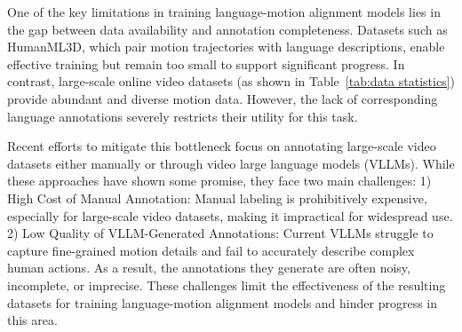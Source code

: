 One of the key limitations in training language-motion alignment models lies in the gap between data availability and annotation completeness. Datasets such as HumanML3D, which pair motion trajectories with language descriptions, enable effective training but remain too small to support significant progress. In contrast, large-scale online video datasets (as shown in Table~\ref{tab:data statistics}) provide abundant and diverse motion data. However, the lack of corresponding language annotations severely restricts their utility for this task.

Recent efforts to mitigate this bottleneck focus on annotating large-scale video datasets either manually or through video large language models (VLLMs). While these approaches have shown some promise, they face two main challenges:
%
1) High Cost of Manual Annotation: Manual labeling is prohibitively expensive, especially for large-scale video datasets, making it impractical for widespread use.
2) Low Quality of VLLM-Generated Annotations: Current VLLMs struggle to capture fine-grained motion details and fail to accurately describe complex human actions. As a result, the annotations they generate are often noisy, incomplete, or imprecise.
%
These challenges limit the effectiveness of the resulting datasets for training language-motion alignment models and hinder progress in this area.






